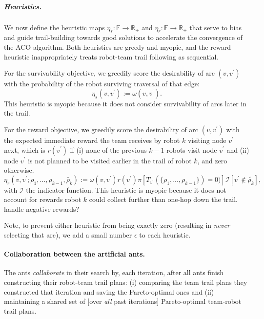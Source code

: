 \documentclass[11pt, oneside]{article}
\begin{document}
\subparagraph{Heuristics.} We now define the heuristic maps $\eta_s: \mathbb{E} \rightarrow \mathbb{R}_+$ and $\eta_r:  \mathbb{E} \rightarrow \mathbb{R}_+$ that serve to bias and guide trail-building towards good solutions to accelerate the convergence of the ACO algorithm. Both heuristics are greedy and myopic, and the reward heuristic inappropriately treats robot-team trail following as sequential.   

For the survivability objective, we greedily score the desirability of arc $(v, v^\prime)$ with the probability of the robot surviving traversal of that edge:
\begin{equation}
	\eta_s(v, v^\prime):=\omega(v, v^\prime).
\end{equation}
This heuristic is myopic because it does not consider survivability of arcs later in the trail. 

For the reward objective, we greedily score the desirability of arc $(v, v^\prime)$ with the expected immediate reward the team receives by robot $k$ visiting node $v^\prime$ next, which is $r(v^\prime)$ if 
(i) none of the previous $k-1$ robots visit node $v^\prime$ and 
(ii) node $v^\prime$ is not planned to be visited earlier in the trail of robot $k$,
and zero otherwise.
\begin{equation}
	\eta_r(v, v^\prime; \rho_1, ..., \rho_{k-1}, \tilde{\rho_k}) :=  \omega(v, v^\prime) r(v^\prime ) 
	 \pi[ T_{v^\prime}(\{\rho_1, ..., \rho_{k-1}\}) = 0)] \mathcal{I}[v^\prime \notin \tilde{\rho_k}],
\end{equation}
with $\mathcal{I}$ the indicator function.
This heuristic is myopic because it does not account for rewards robot $k$ could collect further than one-hop down the trail. 
{\color{red} handle negative rewards?}

Note, to prevent either heuristic from being exactly zero (resulting in \emph{never} selecting that arc), we add a small number $\epsilon$ to each heuristic.

\paragraph{Collaboration between the artificial ants.}
The ants \emph{collaborate} in their search by, each iteration, after all ants finish constructing their robot-team trail plans:
(i) comparing the team trail plans they constructed that iteration and saving the Pareto-optimal ones and
(ii) maintaining a shared set of [over \emph{all} past iterations] Pareto-optimal team-robot trail plans.
\end{document}
